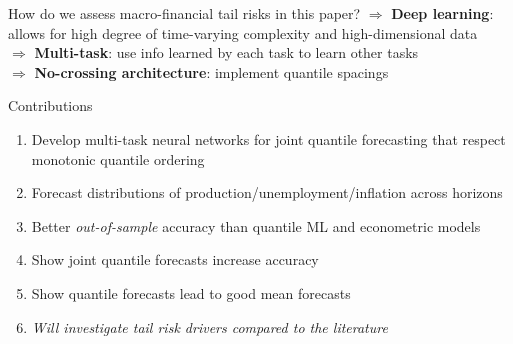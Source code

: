 \documentclass[aspectratio=169]{beamer}
\begin{document}
\begin{frame}{How do we assess macro-financial tail risks in this paper?}
    $\Rightarrow$ \textbf{Deep learning}: allows for high degree of time-varying complexity and high-dimensional data \\
    \vspace{.2cm}
    $\Rightarrow$ \textbf{Multi-task}: use info learned by each task to learn other tasks \parencite{Caruana1997} \\%
    \vspace{.2cm}
    $\Rightarrow$ \textbf{No-crossing architecture}: implement quantile spacings \parencite{Schmidt2016}\\
    \vspace{.7cm}
\end{frame}



\begin{frame}{Contributions}
	\begin{enumerate}
		\item {Develop multi-task neural networks for joint quantile forecasting that respect monotonic quantile ordering}
        \vspace{.2cm}
		\item {Forecast distributions of production/unemployment/inflation across horizons}
        \vspace{.2cm}
		\item {Better \textit{out-of-sample} accuracy than quantile ML and econometric models}
        \vspace{.2cm}
		\item {Show joint quantile forecasts increase accuracy} %
        \vspace{.2cm}
		\item {Show quantile forecasts lead to good mean forecasts} %
        \vspace{.2cm}
		\item \textit{Will investigate tail risk drivers compared to the literature}
	\end{enumerate}    
\end{frame}
\end{document}
